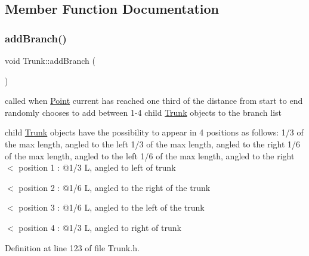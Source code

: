 \subsection{Member Function Documentation}
\mbox{\label{class_trunk_a04d06f2095aeff41ae3413866c128b8a}} 
\subsubsection{\texorpdfstring{addBranch()}{addBranch()}}
{\footnotesize\ttfamily void Trunk\+::add\+Branch (\begin{DoxyParamCaption}{ }\end{DoxyParamCaption})\hspace{0.3cm}{\ttfamily [inline]}}



called when \mbox{\hyperlink{struct_point}{Point}} current has reached one third of the distance from start to end randomly chooses to add between 1-\/4 child \mbox{\hyperlink{class_trunk}{Trunk}} objects to the branch list 

child \mbox{\hyperlink{class_trunk}{Trunk}} objects have the possibility to appear in 4 positions as follows\+: 1/3 of the max length, angled to the left 1/3 of the max length, angled to the right 1/6 of the max length, angled to the left 1/6 of the max length, angled to the right $<$ position 1 \+: @1/3 L, angled to left of trunk

$<$ position 2 \+: @1/6 L, angled to the right of the trunk

$<$ position 3 \+: @1/6 L, angled to the left of the trunk

$<$ position 4 \+: @1/3 L, angled to right of trunk 

Definition at line 123 of file Trunk.\+h.


